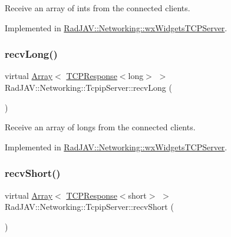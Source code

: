 Receive an array of ints from the connected clients. 



Implemented in \mbox{\hyperlink{class_rad_j_a_v_1_1_networking_1_1wx_widgets_t_c_p_server_a59f79fdace93a01d4c6b062a0e88077d}{Rad\+J\+A\+V\+::\+Networking\+::wx\+Widgets\+T\+C\+P\+Server}}.

\mbox{\label{class_rad_j_a_v_1_1_networking_1_1_tcpip_server_ac33cd6551334e7e9f01c760633bb53db}} 
\subsubsection{\texorpdfstring{recv\+Long()}{recvLong()}}
{\footnotesize\ttfamily virtual \mbox{\hyperlink{class_rad_j_a_v_1_1_array}{Array}}$<$ \mbox{\hyperlink{class_rad_j_a_v_1_1_networking_1_1_t_c_p_response}{T\+C\+P\+Response}}$<$long$>$ $>$ Rad\+J\+A\+V\+::\+Networking\+::\+Tcpip\+Server\+::recv\+Long (\begin{DoxyParamCaption}{ }\end{DoxyParamCaption})\hspace{0.3cm}{\ttfamily [pure virtual]}}



Receive an array of longs from the connected clients. 



Implemented in \mbox{\hyperlink{class_rad_j_a_v_1_1_networking_1_1wx_widgets_t_c_p_server_ab1675000bc5a5a6153822c4083cb1613}{Rad\+J\+A\+V\+::\+Networking\+::wx\+Widgets\+T\+C\+P\+Server}}.

\mbox{\label{class_rad_j_a_v_1_1_networking_1_1_tcpip_server_adb65a13201a5a115b5038e0aac0210c1}} 
\subsubsection{\texorpdfstring{recv\+Short()}{recvShort()}}
{\footnotesize\ttfamily virtual \mbox{\hyperlink{class_rad_j_a_v_1_1_array}{Array}}$<$ \mbox{\hyperlink{class_rad_j_a_v_1_1_networking_1_1_t_c_p_response}{T\+C\+P\+Response}}$<$short$>$ $>$ Rad\+J\+A\+V\+::\+Networking\+::\+Tcpip\+Server\+::recv\+Short (\begin{DoxyParamCaption}{ }\end{DoxyParamCaption})\hspace{0.3cm}{\ttfamily [pure virtual]}}



